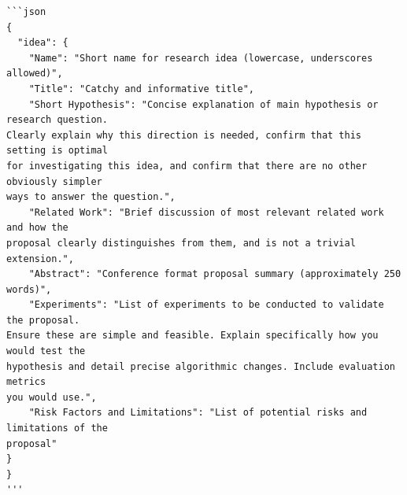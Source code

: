 \begin{tcolorbox}[colback=gray!10, colframe=gray!40!black, breakable=true, title=Prompt for Idea Generation]
\begin{verbatim}
```json
{
  "idea": {
    "Name": "Short name for research idea (lowercase, underscores allowed)",
    "Title": "Catchy and informative title",
    "Short Hypothesis": "Concise explanation of main hypothesis or research question. 
Clearly explain why this direction is needed, confirm that this setting is optimal
for investigating this idea, and confirm that there are no other obviously simpler
ways to answer the question.",
    "Related Work": "Brief discussion of most relevant related work and how the
proposal clearly distinguishes from them, and is not a trivial extension.",
    "Abstract": "Conference format proposal summary (approximately 250 words)",
    "Experiments": "List of experiments to be conducted to validate the proposal.
Ensure these are simple and feasible. Explain specifically how you would test the
hypothesis and detail precise algorithmic changes. Include evaluation metrics
you would use.",
    "Risk Factors and Limitations": "List of potential risks and limitations of the
proposal"
}
}
'''
\end{verbatim}

\end{tcolorbox}





